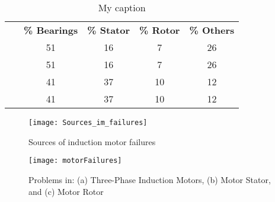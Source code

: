 \begin{table}[]
\centering
\caption{My caption}
\label{tab:failure_distribution}
\begin{tabular}{ccccc}
\multicolumn{1}{c}{\textbf{}} & \multicolumn{1}{c}{\textbf{\% Bearings}} & \multicolumn{1}{c}{\textbf{\% Stator}} & \multicolumn{1}{c}{\textbf{\% Rotor}} & \multicolumn{1}{c}{\textbf{\% Others}}  \\
~\cite{Bonnett2010}  & 51 & 16 & 7 & 26 \\ 
~\cite{Thorsen1995}  & 51 & 16 & 7 & 26 \\
~\cite{Mccoy1986} 	 & 41 & 37 & 10 & 12 \\
~\cite{Bonnett1992}  & 41 & 37 & 10 & 12 \\                              
\end{tabular}
\end{table}


\begin{figure}[htbp]
	\centering
	\texttt{[image: Sources\_im\_failures]}
	\caption{Sources of induction motor failures}
	\label{fig:Sources_im_failures}
\end{figure}

\begin{figure}[htbp]
	\centering
	\texttt{[image: motorFailures]}
	\caption{Problems in: (a) Three-Phase Induction Motors, (b) Motor Stator, and (c) Motor Rotor}
	\label{fig:motorFailures}
\end{figure}